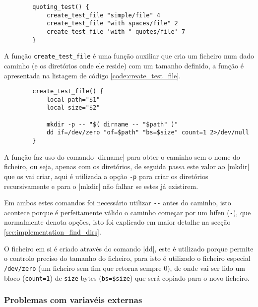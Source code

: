 \begin{listing}[H]
	\centering
	\begin{verbatim}
		quoting_test() {
			create_test_file "simple/file" 4
			create_test_file "with spaces/file" 2
			create_test_file 'with " quotes/file' 7
		}
	\end{verbatim}
	\cprotect\caption{Exemplo da definição de um teste do \Verb|spacecheck.sh|.}
	\label{code:test_definition}
\end{listing}

A função \Verb|create_test_file| é uma função auxiliar que cria um ficheiro num
dado caminho (e os diretórios onde ele reside) com um tamanho definido, a função
é apresentada na listagem de código \ref{code:create_test_file}.

\begin{listing}[H]
	\centering
	\begin{verbatim}
		create_test_file() {
			local path="$1"
			local size="$2"

			mkdir -p -- "$( dirname -- "$path" )"
			dd if=/dev/zero "of=$path" "bs=$size" count=1 2>/dev/null
		}
	\end{verbatim}
	\cprotect\caption{Definição da função \Verb|create_test_file|.}
	\label{code:create_test_file}
\end{listing}

A função faz uso do comando \bashinline|dirname| para obter o caminho sem o nome
do ficheiro, ou seja, apenas com os diretórios, de seguida passa este valor ao
\bashinline|mkdir| que os vai criar, aqui é utilizada a opção \Verb|-p| para
criar os diretórios recursivamente e para o \bashinline|mkdir| não falhar se
estes já existirem.

Em ambos estes comandos foi necessário utilizar \Verb|--| antes do caminho, isto
acontece porque é perfeitamente válido o caminho começar por um hífen
(\Verb|-|), que normalmente denota opções, isto foi explicado em maior detalhe
na secção \ref{sec:implementation_find_dirs}.

O ficheiro em si é criado através do comando \bashinline|dd|, este é utilizado
porque permite o controlo preciso do tamanho do ficheiro, para isto é utilizado
o ficheiro especial \Verb|/dev/zero| (um ficheiro sem fim que retorna sempre 0),
de onde vai ser lido um bloco (\Verb|count=1|) de \Verb|size| bytes
(\Verb|bs=$size|) que será copiado para o novo ficheiro.

\subsubsection{Problemas com variavéis externas}

